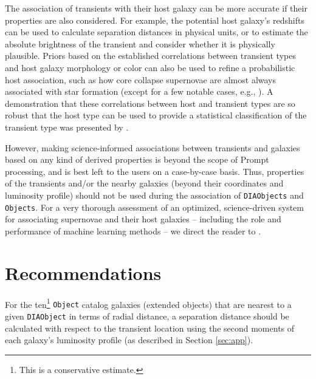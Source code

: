 \documentclass[DM,lsstdraft,authoryear,toc]{lsstdoc}
\begin{document}
The association of transients with their host galaxy can be more accurate if their properties are also considered.
For example, the potential host galaxy's redshifts can be used to calculate separation distances in physical units, or to estimate the absolute brightness of the transient and consider whether it is physically plausible.
Priors based on the established correlations between transient types and host galaxy morphology or color can also be used to refine a probabilistic host association, such as how core collapse supernovae are almost always associated with star formation (except for a few notable cases, e.g., \citealt{2012ApJ...753...68G,2019ApJ...887..127I}).
A demonstration that these correlations between host and transient types are so robust that the host type can be used to provide a statistical classification of the transient type was presented by \citet{2013ApJ...778..167F}.


However, making science-informed associations between transients and galaxies based on any kind of derived properties is beyond the scope of Prompt processing, and is best left to the users on a case-by-case basis. 
Thus, properties of the transients and/or the nearby galaxies (beyond their coordinates and luminosity profile) should not be used during the association of {\tt DIAObjects} and {\tt Objects}.
For a very thorough assessment of an optimized, science-driven system for associating supernovae and their host galaxies -- including the role and performance of machine learning methods -- we direct the reader to \citet{2016AJ....152..154G}.

\section{Recommendations}\label{sec:recs}

For the ten\footnote{This is a conservative estimate.} {\tt Object} catalog galaxies (extended objects) that are nearest to a given {\tt DIAObject} in terms of radial distance, a separation distance should be calculated with respect to the transient location using the second moments of each galaxy's luminosity profile (as described in Section \ref{sec:app}).
\end{document}
